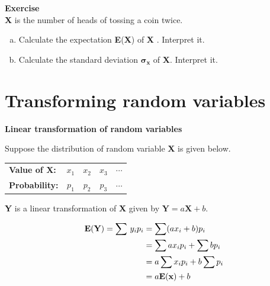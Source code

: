 \documentclass[a4paper, 12pt,twoside]{book}
\begin{document}
\colorbox{champagne}{\parbox{\textwidth}{
\textbf{Exercise}
\vspace{0.3cm}\\
 \textbf{X} is the number of heads of tossing a coin twice.
  \begin{enumerate}[(a)]
      \item Calculate the expectation \textbf{E}(\textbf{X}) of \textbf{X} . Interpret it.
      \item Calculate the standard deviation $\mathbf{\sigma_x}$ of \textbf{X}. Interpret it.
  \end{enumerate}
}}
\newpage

\section{\large{Transforming random variables}}
\vspace{0.3cm}

\textbf{Linear transformation of random variables}
        \vspace{0.3cm}
        
        Suppose the distribution of random variable \textbf{X} is given below. 
             \begin{table}[H]
     \centering
         \begin{tabular}{lcccc}
         \hline
         \textbf{Value of X:} &\hspace{0.2cm}$x_1$&\hspace{0.2cm}$x_2$
         &\hspace{0.2cm}$x_3$&$\cdots$\\
         
                  \textbf{Probability:} &\hspace{0.2cm}$p_1$&\hspace{0.2cm}$p_2$
         &\hspace{0.2cm}$p_3$&$\cdots$\\
         \hline
         \end{tabular}
     \end{table}
     
     \textbf{Y} is a linear transformation of \textbf{X} given by 
     $\textbf{Y} = a\textbf{X} + b$.
     
     \begin{equation*}
     \begin{split}
         \textbf{E}(\textbf{Y}) = \sum \, \large{y_ip_i}
                                &= \sum (ax_i+b)p_i\\                                
                                &= \sum ax_ip_i + \sum bp_i\\
                                & = a\sum x_ip_i + b\sum p_i\\
                                & = a \textbf{E}(\textbf{x}) + b
     \end{split}
     \end{equation*}
     
\end{document}
